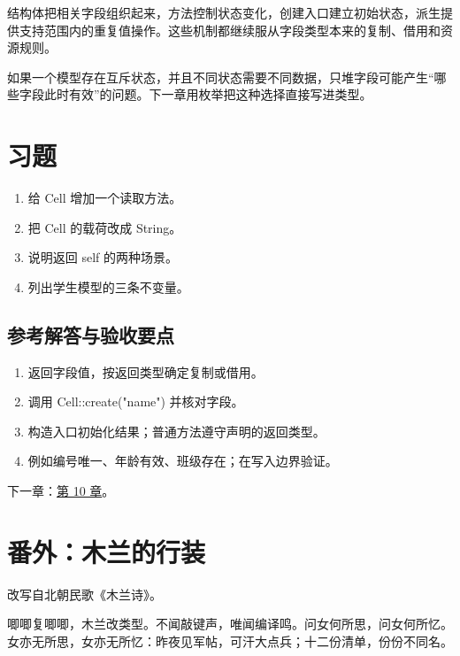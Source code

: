 结构体把相关字段组织起来，方法控制状态变化，创建入口建立初始状态，派生提供支持范围内的重复值操作。这些机制都继续服从字段类型本来的复制、借用和资源规则。

如果一个模型存在互斥状态，并且不同状态需要不同数据，只堆字段可能产生“哪些字段此时有效”的问题。下一章用枚举把这种选择直接写进类型。

\section{习题}

\begin{enumerate}

\item 给 Cell 增加一个读取方法。

\item 把 Cell 的载荷改成 String。

\item 说明返回 self 的两种场景。

\item 列出学生模型的三条不变量。

\end{enumerate}

\subsection*{参考解答与验收要点}

\begin{enumerate}

\item 返回字段值，按返回类型确定复制或借用。

\item 调用 Cell::create("name") 并核对字段。

\item 构造入口初始化结果；普通方法遵守声明的返回类型。

\item 例如编号唯一、年龄有效、班级存在；在写入边界验证。

\end{enumerate}

下一章：\hyperref[ch:10]{第 10 章}。

\section{番外：木兰的行装}

改写自北朝民歌《木兰诗》。

唧唧复唧唧，木兰改类型。不闻敲键声，唯闻编译鸣。问女何所思，问女何所忆。女亦无所思，女亦无所忆：昨夜见军帖，可汗大点兵；十二份清单，份份不同名。

